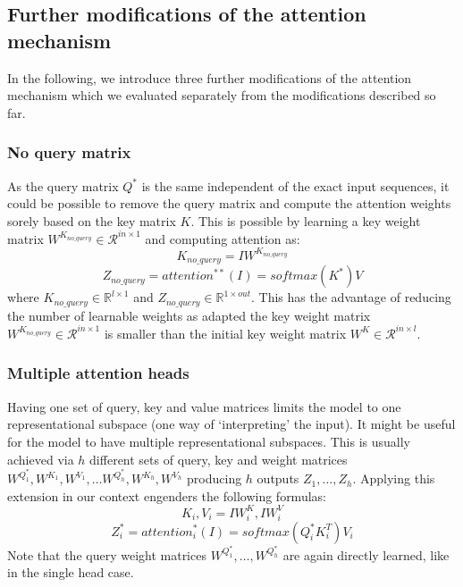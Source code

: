 \subsection{Further modifications of the attention mechanism} \label{subsec:alternative_attention}
In the following, we introduce three further modifications of the attention mechanism which we evaluated separately from the modifications described so far.



\subsubsection{No query matrix} \label{subsubsec:noquery}
As the query matrix ${Q}^*$ is the same independent of the exact input sequences, it could be possible to remove the query matrix and compute the attention weights sorely based on the key matrix $K$.
This is possible by learning a key weight matrix $W^{K_{no\_query}} \in \mathcal{R}^{in \times 1}$ and computing attention as:
$$K_{no\_query} = IW^{K_{no\_query}}$$
$$Z_{no\_query} = {attention}^{**}(I) = softmax(K^*)V$$
where $K_{no\_query} \in \mathbb{R}^{l \times 1}$ and $Z_{no\_query} \in \mathbb{R}^{1 \times out}$. This has the advantage of reducing the number of learnable weights as adapted the key weight matrix $W^{K_{no\_query}} \in \mathcal{R}^{in \times 1}$ is smaller than the initial key weight matrix $W^{K} \in \mathcal{R}^{in \times l}$.  


\subsubsection{Multiple attention heads} \label{subsubsec:heads}
Having one set of query, key and value matrices limits the model to one representational subspace (one way of `interpreting' the input). It might be useful for the model to have multiple representational subspaces. This is usually achieved \cite{allyouneed} via $h$ different sets of query, key and weight matrices $W^{Q^*_1}, W^{K_1}, W^{V_1}, \dots W^{Q^*_{h}}, W^{K_{h}},W^{V_{h}}$ producing $h$  outputs $Z_1, \dots, Z_{h}$. Applying this extension in our context engenders the following formulas:
$$K_i, V_i = IW^K_i, IW^V_i$$
$$Z^*_i = {attention}^*_i(I) = softmax({Q}^*_iK^T_i)V_i$$
Note that the query weight matrices $W^{Q^*_1}, \dots, W^{Q^*_h}$ are again directly learned, like in the single head case. 

